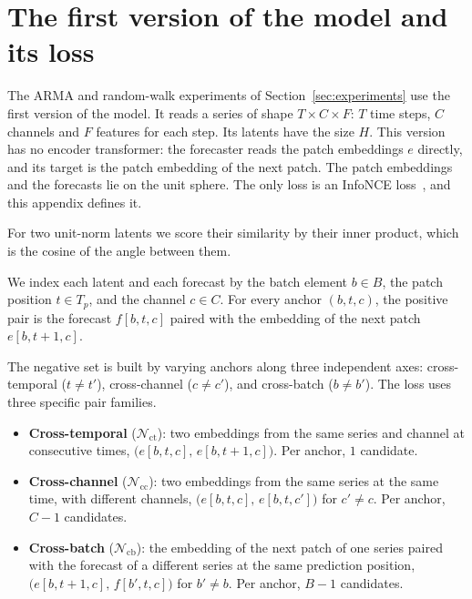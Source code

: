\section{The first version of the model and its loss}
\label{sec:appendix-first-loss}

The ARMA and random-walk experiments of Section~\ref{sec:experiments}
use the first version of the model. It reads a series of shape
$T \times C \times F$: $T$ time steps, $C$ channels and $F$ features
for each step. Its latents have the size $H$. This version has no
encoder transformer: the forecaster reads the patch embeddings $e$
directly, and its target is the patch embedding of the next patch. The patch
embeddings and the forecasts lie on the unit sphere. The only loss is
an InfoNCE loss~\citep{oord2018cpc}, and this appendix defines it.

For two unit-norm latents we score their similarity by their inner
product, which is the cosine of the angle between them.

We index each latent and each forecast by the batch element
$b \in B$, the patch position $t \in T_p$, and the channel $c \in C$.
For every anchor $(b, t, c)$, the positive pair is the forecast
$f[b, t, c]$ paired with the embedding of the next patch
$e[b, t+1, c]$.

The negative set is built by varying anchors along three independent
axes: cross-temporal ($t \neq t'$), cross-channel ($c \neq c'$), and
cross-batch ($b \neq b'$). The loss uses three specific pair families.
\begin{itemize}
\item \textbf{Cross-temporal} ($\mathcal{N}_{\mathrm{ct}}$): two
  embeddings from the same series and channel at consecutive
  times, $\big(e[b, t, c],\, e[b, t+1, c]\big)$. Per anchor, $1$
  candidate.
\item \textbf{Cross-channel} ($\mathcal{N}_{\mathrm{cc}}$): two
  embeddings from the same series at the same time, with
  different channels, $\big(e[b, t, c],\, e[b, t, c']\big)$ for
  $c' \neq c$. Per anchor, $C - 1$ candidates.
\item \textbf{Cross-batch} ($\mathcal{N}_{\mathrm{cb}}$): the
  embedding of the next patch of one series paired with the forecast
  of a different series at the same prediction position,
  $\big(e[b, t+1, c],\, f[b', t, c]\big)$ for $b' \neq b$. Per anchor,
  $B - 1$ candidates.
\end{itemize}

